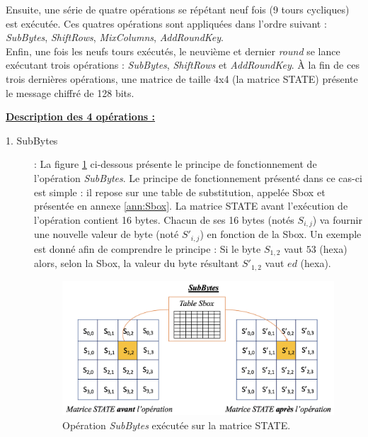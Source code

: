 \documentclass[oneside]{book}
\begin{document}
\hspace{-0.5 cm}Ensuite, une série de quatre opérations se répétant neuf fois (9 tours cycliques) est exécutée. Ces quatres opérations sont appliquées dans l'ordre suivant : \textit{SubBytes}, \textit{ShiftRows}, \textit{MixColumns}, \textit{AddRoundKey}. \\
Enfin, une fois les neufs tours exécutés, le neuvième et dernier \textit{round} se lance exécutant trois opérations : \textit{SubBytes}, \textit{ShiftRows} et \textit{AddRoundKey}. À la fin de ces trois dernières opérations, une matrice de taille 4x4 (la matrice STATE) présente le message chiffré de 128 bits.


\underline{\textbf{Description des 4 opérations :}} \\
\begin{description}
\item[1. SubBytes] : 
La figure \ref{fig:SubBytes} ci-dessous présente le principe de fonctionnement de l'opération \textit{SubBytes}. Le principe de fonctionnement présenté dans ce cas-ci est simple : il repose sur une table de substitution, appelée Sbox et présentée en annexe \ref{ann:Sbox}. La matrice STATE avant l'exécution de l'opération contient 16 bytes. Chacun de ses 16 bytes (notés $S_{i,j}$) va fournir une nouvelle valeur de byte (noté $S'_{i,j}$) en fonction de la Sbox. Un exemple est donné afin de comprendre le principe : Si le byte $S_{1,2}$ vaut $53$ (hexa) alors, selon la Sbox, la valeur du byte résultant $S'_{1,2}$ vaut $ed$ (hexa).

\begin{figure}[htbp]
    \centering
    \includegraphics[scale=0.42]{image/SubBytes}
    \caption{Opération \textit{SubBytes} exécutée sur la matrice STATE.}
    \label{fig:SubBytes}
\end{figure}


\end{description}
\end{document}
